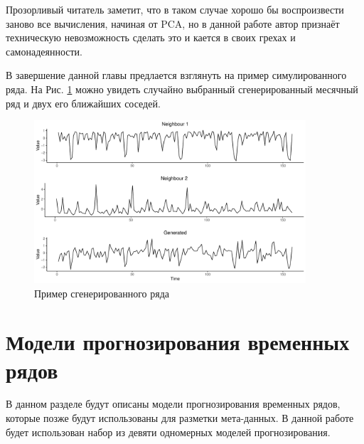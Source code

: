 \documentclass[a4paper,12pt]{article}
\begin{document}
 Прозорливый читатель заметит, что в таком случае хорошо бы воспроизвести заново все вычисления, начиная от PCA, но в данной работе автор признаёт техническую невозможность сделать это и кается в своих грехах и самонадеянности. 
 
	 В завершение данной главы предлается взглянуть на пример симулированного ряда. На Рис. \ref{ex_gen} можно увидеть случайно выбранный сгенерированный месячный ряд и двух его ближайших соседей.
 
 \begin{figure}[!h]
 	
 	\begin{center}
 		\includegraphics[width=
 		0.9\textwidth]{gen_and_neighbours}%
 		\caption{Пример сгенерированного ряда}
 		\label{ex_gen}
 	\end{center}
 \end{figure} 
 
\newpage
 \section{Модели прогнозирования временных рядов}
 
 В данном разделе будут описаны модели прогнозирования  временных рядов, которые позже будут использованы для разметки мета-данных. В данной работе будет использован набор из девяти одномерных моделей прогнозирования. 
 
\end{document}

